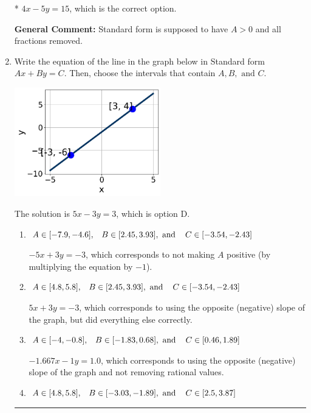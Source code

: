 \documentclass{extbook}[14pt]
\newcommand{\litem}[1]{\item #1

\rule{\textwidth}{0.4pt}}
\begin{document}
\begin{enumerate}
{\begin{enumerate}[label=\Alph*.]
* $4x - 5y = 15$, which is the correct option.
\end{enumerate}

\textbf{General Comment:} Standard form is supposed to have $A > 0$ and all fractions removed.
}
\litem{
Write the equation of the line in the graph below in Standard form $Ax+By=C$. Then, choose the intervals that contain $A, B, \text{ and } C$.

\begin{center}
    \includegraphics[width=0.5\textwidth]{../Figures/linearGraphToStandardCopyB.png}
\end{center}




The solution is \( 5x - 3y = 3 \), which is option D.\begin{enumerate}[label=\Alph*.]
\item \( A \in [-7.9, -4.6], \hspace{3mm} B \in [2.45, 3.93], \text{ and } \hspace{3mm} C \in [-3.54, -2.43] \)

 $-5x + 3y = -3$, which corresponds to not making $A$ positive (by multiplying the equation by $-1$).
\item \( A \in [4.8, 5.8], \hspace{3mm} B \in [2.45, 3.93], \text{ and } \hspace{3mm} C \in [-3.54, -2.43] \)

 $5x + 3y = -3$, which corresponds to using the opposite (negative) slope of the graph, but did everything else correctly.
\item \( A \in [-4, -0.8], \hspace{3mm} B \in [-1.83, 0.68], \text{ and } \hspace{3mm} C \in [0.46, 1.89] \)

 $-1.667x - 1y = 1.0$, which corresponds to using the opposite (negative) slope of the graph and not removing rational values.
\item \( A \in [4.8, 5.8], \hspace{3mm} B \in [-3.03, -1.89], \text{ and } \hspace{3mm} C \in [2.5, 3.87] \)


\end{enumerate}}
\end{enumerate}
\end{document}
